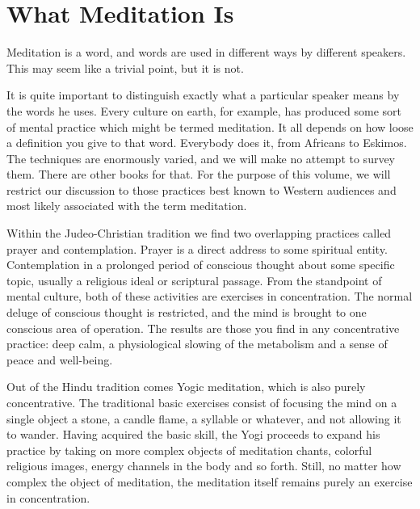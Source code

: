  \chapter{What Meditation Is} 

Meditation is a word, and words are used in different ways by different
speakers. This may seem like a trivial point, but it is not.

It is quite important to distinguish exactly what a particular speaker means by
the words he uses. Every culture on earth, for example, has produced some sort
of mental practice which might be termed meditation. It all depends on how loose
a definition you give to that word. Everybody does it, from Africans to Eskimos.
The techniques are enormously varied, and we will make no attempt to survey
them. There are other books for that. For the purpose of this volume, we will
restrict our discussion to those practices best known to Western audiences and
most likely associated with the term meditation.

Within the Judeo-Christian tradition we find two overlapping practices called
prayer and contemplation. Prayer is a direct address to some spiritual entity.
Contemplation in a prolonged period of conscious thought about some specific
topic, usually a religious ideal or scriptural passage. From the standpoint of
mental culture, both of these activities are exercises in concentration. The
normal deluge of conscious thought is restricted, and the mind is brought to one
conscious area of operation. The results are those you find in any concentrative
practice: deep calm, a physiological slowing of the metabolism and a sense of
peace and well-being.

Out of the Hindu tradition comes Yogic meditation, which is also purely
concentrative. The traditional basic exercises consist of focusing the mind on a
single object a stone, a candle flame, a syllable or whatever, and not allowing
it to wander. Having acquired the basic skill, the Yogi proceeds to expand his
practice by taking on more complex objects of meditation chants, colorful
religious images, energy channels in the body and so forth. Still, no matter how
complex the object of meditation, the meditation itself remains purely an
exercise in concentration.

